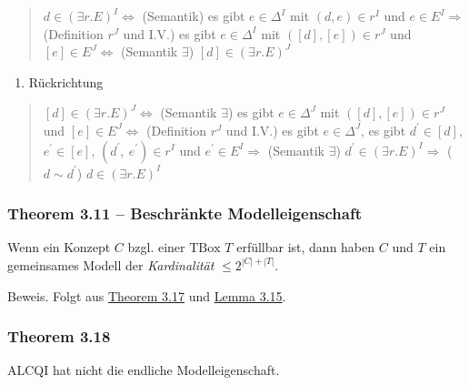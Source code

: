 \begin{quote}
$d \in \left( \exists r.E \right)^{I} \Leftrightarrow$ (Semantik) es
gibt $e \in \Delta^{I}$ mit $\left( d,e \right) \in r^{I}$ und
$e \in E^{I} \Rightarrow$ (Definition $r^{J}$ und I.V.) es gibt
$e \in \Delta^{I}$ mit
$\left( \left\lbrack d \right\rbrack,\left\lbrack e \right\rbrack \right) \in r^{J}$
und $\left\lbrack e \right\rbrack \in E^{J} \Leftrightarrow$ (Semantik
$\exists$)
$\left\lbrack d \right\rbrack \in \left( \exists r.E \right)^{J}$
\end{quote}

\begin{enumerate}
\def\labelenumi{\alph{enumi}.}
\item
  Rückrichtung
\end{enumerate}

\begin{quote}
$\left\lbrack d \right\rbrack \in \left( \exists r.E \right)^{J} \Leftrightarrow$
(Semantik $\exists$) es gibt $e \in \Delta^{J}$ mit
$\left( \left\lbrack d \right\rbrack,\left\lbrack e \right\rbrack \right) \in r^{J}$
und $\left\lbrack e \right\rbrack \in E^{J} \Leftrightarrow$
(Definition $r^{J}$ und I.V.) es gibt $e \in \Delta^{J}$, es gibt
$d^{'} \in \left\lbrack d \right\rbrack$,
$e^{'} \in \left\lbrack e \right\rbrack$,
$\left( d^{'},\ e^{'} \right) \in r^{I}$ und
$e^{'} \in E^{I} \Rightarrow$ (Semantik $\exists$)
$d^{'} \in \left( \exists r.E \right)^{I} \Rightarrow$
($d \sim d^{'}$) $d \in \left( \exists r.E \right)^{I}$
\end{quote}

\subsubsection{Theorem 3.11 -- Beschränkte
Modelleigenschaft}\label{theorem-3.11-beschruxe4nkte-modelleigenschaft}

Wenn ein Konzept $C$ bzgl. einer $\text{TBox}$ $T$ erfüllbar ist,
dann haben $C$ und $T$ ein gemeinsames Modell der
\emph{Kardinalität} $\leq 2^{\left| C \right| + |T|}$.

Beweis. Folgt aus \protect\hyperlink{theorem-3.17}{Theorem 3.17} und
\protect\hyperlink{lemma-3.15}{Lemma 3.15}.

\subsubsection{Theorem 3.18}\label{theorem-3.18}

ALCQI hat nicht die endliche Modelleigenschaft.

